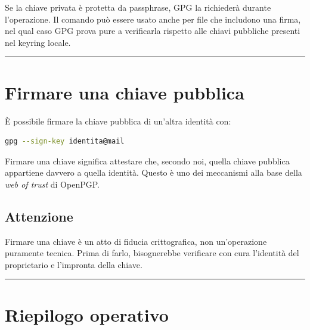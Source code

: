 \documentclass[12pt, a4paper]{report}
\begin{document}
Se la chiave privata è protetta da passphrase, GPG la richiederà durante l'operazione. Il comando può essere usato anche per file che includono una firma, nel qual caso GPG prova pure a verificarla rispetto alle chiavi pubbliche presenti nel keyring locale.

\noindent\rule{\textwidth}{0.4pt}

\section{Firmare una chiave pubblica}

È possibile firmare la chiave pubblica di un'altra identità con:

\begin{lstlisting}[language=bash]
	gpg --sign-key identita@mail
\end{lstlisting}

Firmare una chiave significa attestare che, secondo noi, quella chiave pubblica appartiene davvero a quella identità. Questo è uno dei meccanismi alla base della \textit{web of trust} di OpenPGP.

\subsection{Attenzione}
Firmare una chiave è un atto di fiducia crittografica, non un'operazione puramente tecnica. Prima di farlo, bisognerebbe verificare con cura l'identità del proprietario e l'impronta della chiave.

\noindent\rule{\textwidth}{0.4pt}

\section{Riepilogo operativo}
\end{document}
